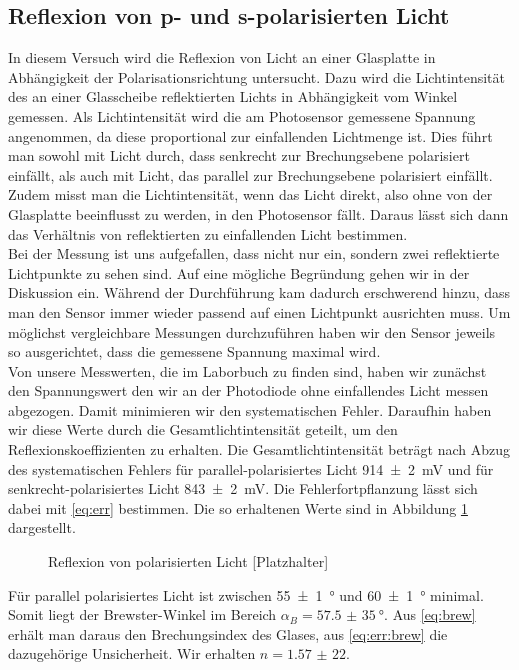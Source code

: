 \subsection{Reflexion von p- und s-polarisierten Licht}
In diesem Versuch wird die Reflexion von Licht an einer Glasplatte in Abhängigkeit der Polarisationsrichtung untersucht. Dazu wird die Lichtintensität des an einer Glasscheibe reflektierten Lichts in Abhängigkeit vom Winkel gemessen. Als Lichtintensität wird die am Photosensor gemessene Spannung angenommen, da diese proportional zur einfallenden Lichtmenge ist. Dies führt man sowohl mit Licht durch, dass senkrecht zur Brechungsebene polarisiert einfällt, als auch mit Licht, das parallel zur Brechungsebene polarisiert einfällt. Zudem misst man die Lichtintensität, wenn das Licht direkt, also ohne von der Glasplatte beeinflusst zu werden, in den Photosensor fällt. Daraus lässt sich dann das Verhältnis von reflektierten zu einfallenden Licht bestimmen.\\
Bei der Messung ist uns aufgefallen, dass nicht nur ein, sondern zwei reflektierte Lichtpunkte zu sehen sind. Auf eine mögliche Begründung gehen wir in der Diskussion ein. Während der Durchführung kam dadurch erschwerend hinzu, dass man den Sensor immer wieder passend auf einen Lichtpunkt ausrichten muss. Um möglichst vergleichbare Messungen durchzuführen haben wir den Sensor jeweils so ausgerichtet, dass die gemessene Spannung maximal wird.\\
Von unsere Messwerten, die im Laborbuch zu finden sind, haben wir zunächst den Spannungswert den wir an der Photodiode ohne einfallendes Licht messen abgezogen. Damit minimieren wir den systematischen Fehler. Daraufhin haben wir diese Werte durch die Gesamtlichtintensität geteilt, um den Reflexionskoeffizienten zu erhalten. Die Gesamtlichtintensität beträgt nach Abzug des systematischen Fehlers für parallel-polarisiertes Licht \SI{914(2)}{mV} und für senkrecht-polarisiertes Licht \SI{843(2)}{mV}. Die Fehlerfortpflanzung lässt sich dabei mit \eqref{eq:err} bestimmen. Die so erhaltenen Werte sind in Abbildung \ref{fig:refp} dargestellt.\\


\begin{figure}[H]
\centering

\caption{Reflexion von polarisierten Licht [Platzhalter]}
\label{fig:refp}
\end{figure}
Für parallel polarisiertes Licht ist zwischen \SI{55(1)}{\degree} und \SI{60(1)}{\degree} minimal. Somit liegt der Brewster-Winkel im Bereich $ \alpha_B = \SI{57,5(35)}{\degree} $.
Aus \eqref{eq:brew} erhält man daraus den Brechungsindex des Glases, aus \eqref{eq:err:brew} die dazugehörige Unsicherheit. Wir erhalten $ n = \num{1,57(22)} $.

